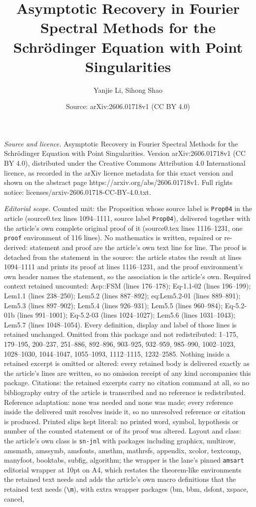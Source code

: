 \documentclass[10pt,a4paper]{amsart}
\title[Asymptotic Recovery in Fourier Spectral Methods for the Schr]{Asymptotic Recovery in Fourier Spectral Methods for the Schr\"odinger Equation with Point Singularities}
\author{Yanjie Li, Sihong Shao}
\date{Source: arXiv:2606.01718v1 (CC BY 4.0)}
\begin{document}
\maketitle

\noindent\emph{Source and licence.} Asymptotic Recovery in Fourier Spectral Methods for the Schr\"odinger Equation with Point Singularities. Version arXiv:2606.01718v1 (CC BY 4.0), distributed under the Creative Commons Attribution 4.0 International licence, as recorded in the arXiv licence metadata for this exact version and shown on the abstract page https://arxiv.org/abs/2606.01718v1. Full rights notice: licenses/arxiv-2606.01718-CC-BY-4.0.txt.\par\smallskip

\noindent\textit{Editorial scope.} Counted unit: the Proposition whose source label is \texttt{Prop04} in the article (source0.tex lines 1094--1111, source label \texttt{Prop04}), delivered together with the article's own complete original proof of it (source0.tex lines 1116--1231, one \texttt{proof} environment of 116 lines). No mathematics is written, repaired or re-derived: statement and proof are the article's own text line for line. The proof is detached from the statement in the source: the article states the result at lines 1094--1111 and prints its proof at lines 1116--1231, and the proof environment's own header names the statement, so the association is the article's own. Required context retained uncounted: Asp::FSM (lines 176--178); Eq-1.1-02 (lines 196--199); Lem1.1 (lines 238--250); Lem5.2 (lines 887--892); eq:Lem5.2-01 (lines 889--891); Lem5.3 (lines 897--902); Lem5.4 (lines 926--931); Lem5.5 (lines 960--984); Eq-5.2-01b (lines 991--1001); Eq-5.2-03 (lines 1024--1027); Lem5.6 (lines 1031--1043); Lem5.7 (lines 1048--1054). Every definition, display and label of those lines is retained unchanged. Omitted from this package and not redistributed: 1--175, 179--195, 200--237, 251--886, 892--896, 903--925, 932--959, 985--990, 1002--1023, 1028--1030, 1044--1047, 1055--1093, 1112--1115, 1232--2585. Nothing inside a retained excerpt is omitted or altered: every retained body is delivered exactly as the article's lines are written, so no omission receipt of any kind accompanies this package. Citations: the retained excerpts carry no citation command at all, so no bibliography entry of the article is transcribed and no reference is redistributed. Reference adaptation: none was needed and none was made; every reference inside the delivered unit resolves inside it, so no unresolved reference or citation is produced. Printed slips kept literal: no printed word, symbol, hypothesis or number of the counted statement or of its proof was altered. Layout and class: the article's own class is \texttt{sn-jnl} with packages including graphicx, multirow, amsmath, amssymb, amsfonts, amsthm, mathrsfs, appendix, xcolor, textcomp, manyfoot, booktabs, subfig, algorithm; the wrapper is the lane's pinned \texttt{amsart} editorial wrapper at 10pt on A4, which restates the theorem-like environments the retained text needs and adds the article's own macro definitions that the retained text needs (\texttt{\textbackslash m}), with extra wrapper packages (bm, bbm, dsfont, xspace, cancel, 
\end{document}
